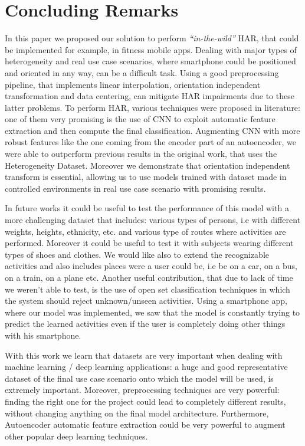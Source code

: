 
\section{Concluding Remarks}
\label{sec:concluding-remarks}

In this paper we proposed our solution to perform \textit{``in-the-wild''} HAR, that could be implemented for example, in fitness mobile apps. Dealing with major types of heterogeneity and real use case scenarios, where smartphone could be positioned and oriented in any way, can be a difficult task. Using a good preprocessing pipeline, that implements linear interpolation, orientation independent transformation and data centering, can mitigate HAR impairments due to these latter problems. To perform HAR, various techniques were proposed in literature: one of them very promising is the use of CNN to exploit automatic feature extraction and then compute the final classification. Augmenting CNN with more robust features like the one coming from the encoder part of an autoencoder, we were able to outperform previous results in the original work, that uses the Heterogeneity Dataset. Moreover we demonstrate that orientation independent transform is essential, allowing us to use models trained with dataset made in controlled environments in real use case scenario with promising results. 

In future works it could be useful to test the performance of this model with a more challenging dataset that includes: various types of persons, i.e with different weights, heights, ethnicity, etc. and various type of routes where activities are performed. Moreover it could be useful to test it with subjects wearing different types of shoes and clothes. We would like also to extend the recognizable activities and also includes places were a user could be, i.e be on a car, on a bus, on a train, on a plane etc. Another useful contribution, that due to lack of time we weren't able to test, is the use of open set classification techniques in which the system should reject unknown/unseen activities. Using a smartphone app, where our model was implemented, we saw that the model is constantly trying to predict the learned activities even if the user is completely doing other things with his smartphone.

With this work we learn that datasets are very important when dealing with machine learning / deep learning applications: a huge and good representative dataset of the final use case scenario onto which the model will be used, is extremely important. Moreover, preprocessing techniques are very powerful: finding the right one for the project could lead to completely different results, without changing anything on the final model architecture. Furthermore, Autoencoder automatic feature extraction could be very powerful to augment other popular deep learning techniques.

